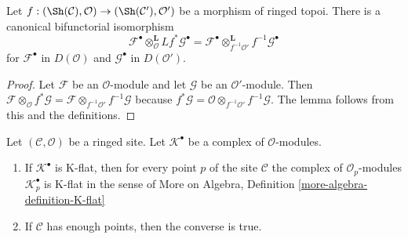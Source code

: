 \begin{lemma}
\label{lemma-variant-derived-pullback}
Let $f : (\Sh(\mathcal{C}), \mathcal{O}) \to (\Sh(\mathcal{C}'), \mathcal{O}')$
be a morphism of ringed topoi. There is a canonical bifunctorial
isomorphism
$$
\mathcal{F}^\bullet
\otimes_\mathcal{O}^{\mathbf{L}}
Lf^*\mathcal{G}^\bullet
=
\mathcal{F}^\bullet 
\otimes_{f^{-1}\mathcal{O}'}^{\mathbf{L}}
f^{-1}\mathcal{G}^\bullet 
$$
for $\mathcal{F}^\bullet$ in $D(\mathcal{O})$ and
$\mathcal{G}^\bullet$ in $D(\mathcal{O}')$.
\end{lemma}

\begin{proof}
Let $\mathcal{F}$ be an $\mathcal{O}$-module and let $\mathcal{G}$
be an $\mathcal{O}'$-module. Then
$\mathcal{F} \otimes_{\mathcal{O}} f^*\mathcal{G} =
\mathcal{F} \otimes_{f^{-1}\mathcal{O}'} f^{-1}\mathcal{G}$
because
$f^*\mathcal{G} =
\mathcal{O} \otimes_{f^{-1}\mathcal{O}'} f^{-1}\mathcal{G}$.
The lemma follows from this and the definitions.
\end{proof}











\begin{lemma}
\label{lemma-check-K-flat-stalks}
Let $(\mathcal{C}, \mathcal{O})$ be a ringed site.
Let $\mathcal{K}^\bullet$ be a complex of $\mathcal{O}$-modules.
\begin{enumerate}
\item If $\mathcal{K}^\bullet$ is K-flat, then for every point $p$
of the site $\mathcal{C}$ the complex of $\mathcal{O}_p$-modules
$\mathcal{K}_p^\bullet$ is K-flat in the sense of
More on Algebra, Definition \ref{more-algebra-definition-K-flat}
\item If $\mathcal{C}$ has enough points, then the converse is true.
\end{enumerate}
\end{lemma}

